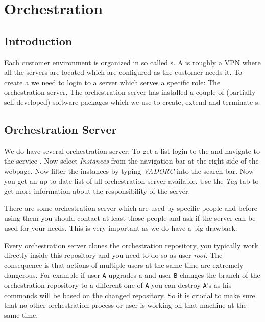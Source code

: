 \chapter{\pod{} Orchestration}
	\section{Introduction}
	Each customer environment is organized in so called \pod{}s. A \pod{} is roughly a VPN where all the servers are located which are configured as the customer needs it. To create a \pod{} we need to login to a server which serves a specific role: The orchestration server. The orchestration server has installed a couple of (partially self-developed) software packages which we use to create, extend and terminate \pod{}s.
	\section{Orchestration Server}
	We do have several orchestration server. To get a list login to the \awsc{} and navigate to the service \ectwo{}. Now select \emph{Instances} from the navigation bar at the right side of the webpage. Now filter the instances by typing \emph{VADORC} into the search bar. Now you get an up-to-date list of all orchestration server available. Use the \emph{Tag} tab to get more information about the responsibility of the server.
	
There are some orchestration server which are used by specific people and before using them you should contact at least those people and ask if the server can be used for your needs. This is very important as we do have a big drawback:

Every orchestration server clones the orchestration repository, you typically work directly inside this repository and you need to do so as user \emph{root}. The consequence is that actions of multiple users at the same time are extremely dangerous. For example if user \texttt{A} upgrades a \pod{} and user \texttt{B} changes the branch of the orchestration repository to a different one of \texttt{A} you can destroy \texttt{A}'s \pod{} as his commands will be based on the changed repository. So it is crucial to make sure that no other orchestration process or user is working on that machine at the same time.

